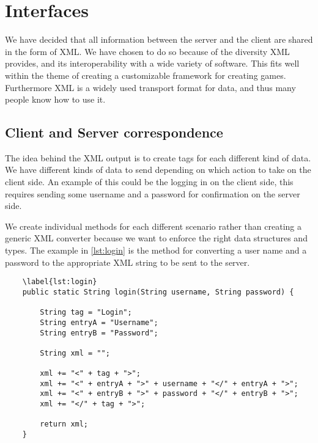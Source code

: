\section{Interfaces}

We have decided that all information between the server and the client are shared in the form of XML. We have chosen to do so because of the diversity XML provides, and its interoperability with a wide variety of software. This fits well within the theme of creating a customizable framework for creating games. Furthermore XML is a widely used transport format for data, and thus many people know how to use it.%

\subsection{Client and Server correspondence}

The idea behind the XML output is to create tags for each different kind of data. We have different kinds of data to send depending on which action to take on the client side. An example of this could be the logging in on the client side, this requires sending some username and a password for confirmation on the server side.

We create individual methods for each different scenario rather than creating a generic XML converter because we want to enforce the right data structures and types. The example in \cref{lst:login} is the method for converting a user name and a password to the appropriate XML string to be sent to the server.

\begin{lstlisting}
    \label{lst:login}
    public static String login(String username, String password) {

        String tag = "Login";
        String entryA = "Username";
        String entryB = "Password";

        String xml = "";

        xml += "<" + tag + ">";
        xml += "<" + entryA + ">" + username + "</" + entryA + ">";
        xml += "<" + entryB + ">" + password + "</" + entryB + ">";
        xml += "</" + tag + ">";

        return xml;
    }
\end{lstlisting}

